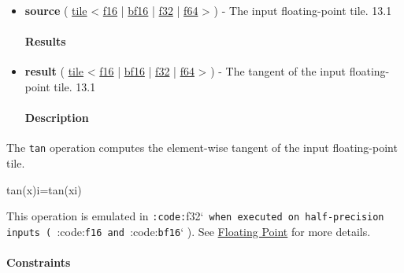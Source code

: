 \documentclass{article}
\begin{document}
\begin{itemize}
\item \textbf{source} ( \href{https://docs.nvidia.com/cuda/tile-ir/latest/sections/types.html#type-tile}{tile} < \href{https://docs.nvidia.com/cuda/tile-ir/latest/sections/types.html#subsection-element-types}{f16} | \href{https://docs.nvidia.com/cuda/tile-ir/latest/sections/types.html#subsection-element-types}{bf16} | \href{https://docs.nvidia.com/cuda/tile-ir/latest/sections/types.html#subsection-element-types}{f32} | \href{https://docs.nvidia.com/cuda/tile-ir/latest/sections/types.html#subsection-element-types}{f64} > ) - The input floating-point tile. 13.1


\paragraph{Results}

\item \textbf{result} ( \href{https://docs.nvidia.com/cuda/tile-ir/latest/sections/types.html#type-tile}{tile} < \href{https://docs.nvidia.com/cuda/tile-ir/latest/sections/types.html#subsection-element-types}{f16} | \href{https://docs.nvidia.com/cuda/tile-ir/latest/sections/types.html#subsection-element-types}{bf16} | \href{https://docs.nvidia.com/cuda/tile-ir/latest/sections/types.html#subsection-element-types}{f32} | \href{https://docs.nvidia.com/cuda/tile-ir/latest/sections/types.html#subsection-element-types}{f64} > ) - The tangent of the input floating-point tile. 13.1


\paragraph{Description}

\end{itemize}
The \texttt{tan} operation computes the element-wise tangent of the input floating-point tile.


tan(x)i=tan(xi)

This operation is emulated in \texttt{:code:}f32`\texttt{ when executed on half-precision inputs ( }:code:\texttt{f16}\texttt{ and }:code:\texttt{bf16}` ). See \href{https://docs.nvidia.com/cuda/tile-ir/latest/sections/operations.html#op-group-floating-point}{Floating Point} for more details.



\paragraph{Constraints}
\end{document}
